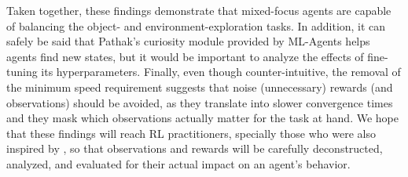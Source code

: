         
        
    
        Taken together, these findings demonstrate that mixed-focus agents are capable of balancing the object- and environment-exploration tasks.
        In addition, it can safely be said that Pathak's curiosity module provided by ML-Agents helps agents find new states, but it would be important to analyze the effects of fine-tuning its hyperparameters.
        Finally, even though counter-intuitive, the removal of the minimum speed requirement suggests that noise (unnecessary) rewards (and observations) should be avoided, as they translate into slower convergence times and they mask which observations actually matter for the task at hand.
        We hope that these findings will reach RL practitioners, specially those who were also inspired by \cite{silver2021reward}, so that observations and rewards will be carefully deconstructed, analyzed, and evaluated for their actual impact on an agent's behavior.


